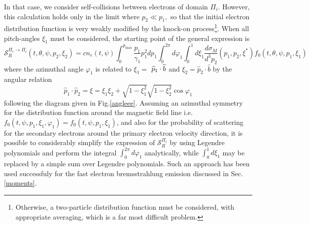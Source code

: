 In that case, we consider self-collisions between electrons of domain $\Pi
_{i}.$ However, this calculation holds only in the limit where $p_{2}\ll
p_{1},$ so that the initial electron distribution function is very weakly
modified by the knock-on process\footnote{%
Otherwise, a two-particle distribution function must be considered, with
appropriate averaging, which is a far most difficult problem.}.  When all
pitch-angles $\xi _{1}$ must be considered, the starting point of the
general expression is 
\begin{equation}
\mathcal{S}_{R}^{\Pi _{i}\rightarrow \Pi _{i}}\left( t,\theta ,\psi
,p_{2},\xi _{2}\right) =cn_{e}\left( t,\psi \right) \int_{0}^{p_{\max }}%
\frac{p_{1}}{\gamma _{1}}p_{1}^{2}dp_{1}\int_{0}^{2\pi }d\varphi
_{1}\int_{0}^{1}d\xi _{1}\frac{d\sigma _{M}}{d^{3}p_{2}}\left(
p_{1},p_{2},\xi ^{\ast }\right) f_{0}\left( t,\theta ,\psi ,p_{1},\xi
_{1}\right)   \label{generalsecondarysource}
\end{equation}%
where the azimuthal angle $\varphi _{1}$ is related to $\xi _{1}=$ $\widehat{%
p}_{1}\cdot \widehat{b}$ and $\xi _{2}=\widehat{p}_{2}\cdot \widehat{b}$ by
the angular relation 
\begin{equation}
\widehat{p}_{1}\cdot \widehat{p}_{2}=\xi =\xi _{1}\xi _{2}+\sqrt{1-\xi
_{1}^{2}}\sqrt{1-\xi _{2}^{2}}\cos \varphi _{1}
\end{equation}%
following the diagram given in Fig.\ref{angleee}. Assuming an azimuthal
symmetry for the distribution function around the magnetic field line i.e. $%
f_{0}\left( t,\psi ,p_{1},\xi _{1},\varphi _{1}\right) =f_{0}\left( t,\psi
,p_{1},\xi _{1}\right) $, and also for the probability of scattering for the
secondary electrons around the primary electron velocity direction, it is
possible to considerably simplify the expression of $\mathcal{S}_{R}^{\Pi
_{i}}$ by using Legendre polynomials and perform the integral $%
\int_{0}^{2\pi }d\varphi _{1}$ analytically, while $\int_{0}^{1}d\xi _{1}$
may be replaced by a simple sum over Legendre polynomials. Such an approach
has been used successfuly for the fast electron bremsstrahlung emission
discussed in Sec. \ref{moments}.

